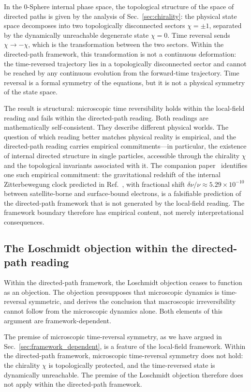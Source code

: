\documentclass[%
 reprint, amsmath,amssymb, aps, prb, ]{revtex4-2}
\numberwithin{equation}{section}
\begin{document}
In the 0-Sphere internal phase space, the topological structure of the space of directed paths is given by the analysis of Sec.~\ref{sec:chirality}: the physical state space decomposes into two topologically disconnected sectors $\chi = \pm 1$, separated by the dynamically unreachable degenerate state $\chi = 0$. Time reversal sends $\chi \to -\chi$, which is the transformation between the two sectors. Within the directed-path framework, this transformation is not a continuous deformation: the time-reversed trajectory lies in a topologically disconnected sector and cannot be reached by any continuous evolution from the forward-time trajectory. Time reversal is a formal symmetry of the equations, but it is not a physical symmetry of the state space.

The result is structural: microscopic time reversibility holds within the local-field reading and fails within the directed-path reading. Both readings are mathematically self-consistent. They describe different physical worlds. The question of which reading better matches physical reality is empirical, and the directed-path reading carries empirical commitments---in particular, the existence of internal directed structure in single particles, accessible through the chirality $\chi$ and the topological invariants associated with it. The companion paper~\cite{hanamura55} identifies one such empirical commitment: the gravitational redshift of the internal Zitterbewegung clock predicted in Ref.~\cite{hanamura22}, with fractional shift $\delta\nu/\nu \approx 5.29 \times 10^{-10}$ between satellite-borne and surface-bound electrons, is a falsifiable prediction of the directed-path framework that is not generated by the local-field reading. The framework boundary therefore has empirical content, not merely interpretational consequences.

\subsection{The Loschmidt objection within the directed-path reading}
\label{sec:loschmidt_resolution}

Within the directed-path framework, the Loschmidt objection ceases to function as an objection. The objection presupposes that microscopic dynamics is time-reversal symmetric, and derives the conclusion that macroscopic irreversibility cannot follow from the microscopic dynamics alone. Both elements of this argument are framework-dependent.

The premise of microscopic time-reversal symmetry, as we have argued in Sec.~\ref{sec:framework_dependent}, is a feature of the local-field framework. Within the directed-path framework, microscopic time-reversal symmetry does not hold: the chirality $\chi$ is topologically protected, and the time-reversed state is dynamically unreachable. The premise of the Loschmidt objection therefore does not apply within the directed-path framework.
\end{document}
